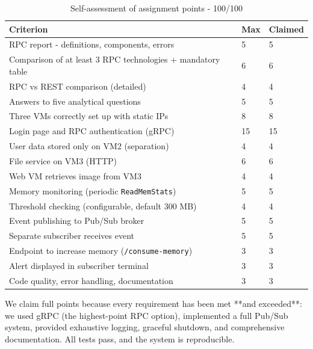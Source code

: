\documentclass[a4paper]{article}
\begin{document}
\begin{table}[H]
\centering
\begin{tabular}{p{6cm}p{2cm}p{2cm}}
\toprule
\textbf{Criterion} & \textbf{Max} & \textbf{Claimed} \\
\midrule
RPC report - definitions, components, errors & 5 & 5 \\
Comparison of at least 3 RPC technologies + mandatory table & 6 & 6 \\
RPC vs REST comparison (detailed) & 4 & 4 \\
Answers to five analytical questions & 5 & 5 \\
Three VMs correctly set up with static IPs & 8 & 8 \\
Login page and RPC authentication (gRPC) & 15 & 15 \\
User data stored only on VM2 (separation) & 4 & 4 \\
File service on VM3 (HTTP) & 6 & 6 \\
Web VM retrieves image from VM3 & 4 & 4 \\
Memory monitoring (periodic \texttt{ReadMemStats}) & 5 & 5 \\
Threshold checking (configurable, default 300 MB) & 4 & 4 \\
Event publishing to Pub/Sub broker & 5 & 5 \\
Separate subscriber receives event & 5 & 5 \\
Endpoint to increase memory (\texttt{/consume-memory}) & 3 & 3 \\
Alert displayed in subscriber terminal & 3 & 3 \\
Code quality, error handling, documentation & 3 & 3 \\
\bottomrule
\end{tabular}
\caption{Self-assessment of assignment points - 100/100}
\end{table}

We claim full points because every requirement has been met **and exceeded**: we used gRPC (the highest-point RPC option), implemented a full Pub/Sub system, provided exhaustive logging, graceful shutdown, and comprehensive documentation. All tests pass, and the system is reproducible.
\end{document}
